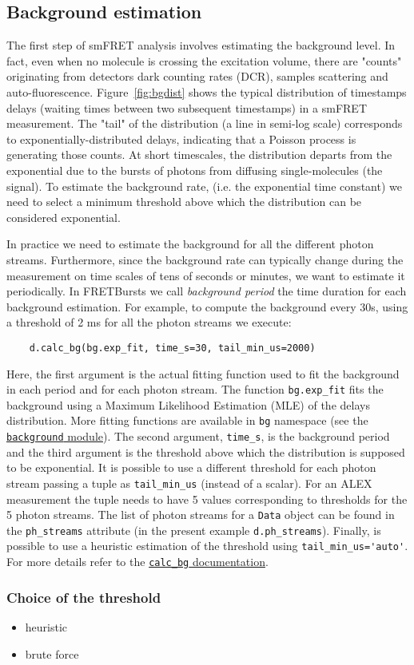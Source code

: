 \subsection{Background estimation}

The first step of smFRET analysis involves estimating the background level. In fact, even when no molecule is crossing the excitation volume, there are "counts" originating from detectors dark counting rates (DCR), samples scattering and auto-fluorescence. Figure~\ref{fig:bgdist} shows the typical distribution of timestamps delays (waiting times between two subsequent timestamps) in a smFRET measurement. The "tail" of the distribution (a line in semi-log scale) corresponds to exponentially-distributed delays, indicating that a Poisson process is generating those counts. At short timescales, the distribution departs from the exponential due to the bursts of photons from diffusing single-molecules (the signal).
To estimate the background rate, (i.e. the exponential time constant) we need to select a minimum threshold above which the distribution can be considered exponential. 

In practice we need to estimate the background for all the different photon streams. Furthermore, since the background rate can typically change during the measurement on time scales of tens of seconds or minutes, we want to estimate it periodically. 
In FRETBursts we call \textit{background period} the time duration for each background estimation. For example, to compute the background every 30s, using a threshold of 2 ms for all the photon streams we execute:

\begin{verbatim}
    d.calc_bg(bg.exp_fit, time_s=30, tail_min_us=2000)
\end{verbatim}

Here, the first argument is the actual fitting function used to fit the
background in each period and for each photon stream. The function 
\verb|bg.exp_fit| fits the background using a Maximum Likelihood Estimation 
(MLE) of the delays distribution. More fitting functions are available in 
\verb|bg| namespace (see the 
\href{http://fretbursts.readthedocs.org/en/latest/background.html}
{\texttt{background} module}). The second argument, \verb|time_s|, is the background 
period and the third argument is the threshold above which the distribution 
is supposed to be exponential. It is possible to use a different threshold 
for each photon stream passing a tuple as \verb|tail_min_us| (instead 
of a scalar). For an ALEX measurement the tuple needs to have 5 values 
corresponding to thresholds for the 5 photon streams. The list of photon 
streams for a \verb|Data| object can be found in the \verb|ph_streams| 
attribute (in the present example \verb|d.ph_streams|). Finally, is 
possible to use a heuristic estimation of the threshold using 
\verb|tail_min_us='auto'|. For more details refer to the 
\href{http://fretbursts.readthedocs.org/en/latest/data_class.html#fretbursts.burstlib.Data.calc_bg}{\texttt{calc\_bg} documentation}.

\subsubsection{Choice of the threshold}
\begin{itemize}
\item heuristic
\item brute force
\end{itemize}
